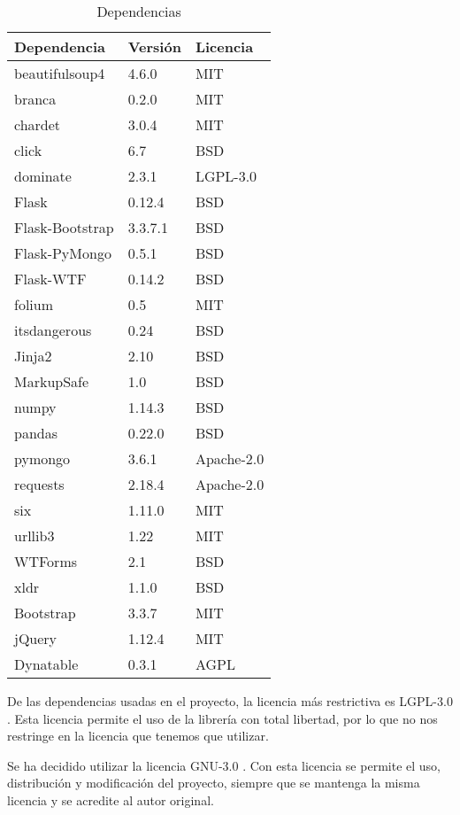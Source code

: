 \begin{table}[]
	\centering
	\begin{tabular}{lll}
		\hline
		Dependencia & Versión & Licencia \\ \hline
		beautifulsoup4 & 4.6.0 & MIT \\
		branca & 0.2.0& MIT \\
		chardet & 3.0.4 & MIT \\
		click & 6.7 & BSD \\
		dominate & 2.3.1 & LGPL-3.0 \\
		Flask & 0.12.4 & BSD \\
		Flask-Bootstrap & 3.3.7.1 & BSD \\
		Flask-PyMongo & 0.5.1 & BSD \\
		Flask-WTF & 0.14.2 & BSD \\
		folium & 0.5 & MIT \\
		itsdangerous & 0.24 & BSD \\
		Jinja2 & 2.10 & BSD \\
		MarkupSafe & 1.0 & BSD \\
		numpy & 1.14.3 & BSD \\
		pandas & 0.22.0 & BSD \\
		pymongo & 3.6.1 & Apache-2.0 \\
		requests & 2.18.4 & Apache-2.0 \\
		six & 1.11.0 & MIT \\
		urllib3 & 1.22 & MIT \\
		WTForms & 2.1 & BSD \\
		xldr & 1.1.0 & BSD \\
		Bootstrap & 3.3.7 & MIT \\
		jQuery & 1.12.4 & MIT \\
		Dynatable & 0.3.1 & AGPL \\
		\bottomrule
	\end{tabular}
	\caption{Dependencias}
	\label{tab:dependencias}
\end{table}

De las dependencias usadas en el proyecto, la licencia más restrictiva es LGPL-3.0 \cite{misc:lgpl}. Esta licencia permite el uso de la librería con total libertad, por lo que no nos restringe en la licencia que tenemos que utilizar.

Se ha decidido utilizar la licencia GNU-3.0 \cite{misc:gnu3}. Con esta licencia se permite el uso, distribución y modificación del proyecto, siempre que se mantenga la misma licencia y se acredite al autor original.
